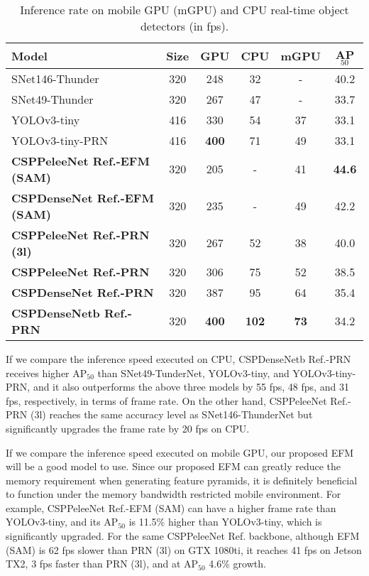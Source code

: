 \documentclass{article}
\begin{document}
\begin{table}[h]
	\centering
	\begin{threeparttable}[h]
		\footnotesize
		\caption{Inference rate on mobile GPU (mGPU) and CPU real-time object detectors (in fps).}
		\label{table:speed}
		\setlength\tabcolsep{2.0pt}
		\begin{tabular}{lccccc}
			\toprule
			Model & Size & GPU & CPU & mGPU & AP$_{50}$ \\			
			\midrule
			SNet146-Thunder \cite{qin2019thundernet} & 320 & 248 & 32 & - & 40.2 \\	
			SNet49-Thunder \cite{qin2019thundernet} & 320 & 267 & 47 & - & 33.7 \\	
			\midrule
			YOLOv3-tiny \cite{redmon2018yolov3} & 416 & 330 & 54 & 37 & 33.1 \\
			YOLOv3-tiny-PRN \cite{wang2019enriching} & 416 & \textbf{400} & 71 & 49 & 33.1 \\		
			\midrule
			\textbf{CSPPeleeNet Ref.-EFM (SAM)} & 320 & 205 & - & 41 & \textbf{44.6} \\	
			\textbf{CSPDenseNet Ref.-EFM (SAM)} & 320 & 235 & - & 49 & 42.2 \\	
			\midrule
			\textbf{CSPPeleeNet Ref.-PRN (3l)} & 320 & 267 & 52 & 38 & 40.0 \\	
			\textbf{CSPPeleeNet Ref.-PRN} & 320 & 306 & 75 & 52 & 38.5 \\	
			\textbf{CSPDenseNet Ref.-PRN} & 320 & 387 & 95 & 64 & 35.4 \\	
			\textbf{CSPDenseNetb Ref.-PRN} & 320 & \textbf{400} & \textbf{102} & \textbf{73} & 34.2 \\	
			\bottomrule
		\end{tabular}
	\end{threeparttable}
\end{table}

If we compare the inference speed executed on CPU, CSPDenseNetb Ref.-PRN receives higher AP$_{50}$ than SNet49-TunderNet, YOLOv3-tiny, and YOLOv3-tiny-PRN, and it also outperforms the above three models by 55 fps, 48 fps, and 31 fps, respectively, in terms of frame rate. On the other hand, CSPPeleeNet Ref.-PRN (3l) reaches the same accuracy level as SNet146-ThunderNet but significantly upgrades the frame rate by 20 fps on CPU.

If we compare the inference speed executed on mobile GPU, our proposed EFM will be a good model to use. Since our proposed EFM can greatly reduce the memory requirement when generating feature pyramids, it is definitely beneficial to function under the memory bandwidth restricted mobile environment. For example, CSPPeleeNet Ref.-EFM (SAM) can have a higher frame rate than YOLOv3-tiny, and its AP$_{50}$ is 11.5\% higher than YOLOv3-tiny, which is significantly upgraded. For the same CSPPeleeNet Ref. backbone, although EFM (SAM) is 62 fps slower than PRN (3l) on GTX 1080ti, it reaches 41 fps on Jetson TX2, 3 fps faster than PRN (3l), and at AP$_{50}$ 4.6\% growth.
\end{document}
